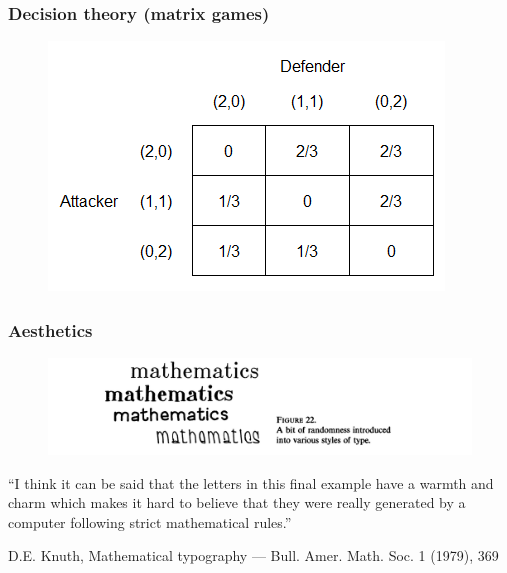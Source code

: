 \documentclass[12pt]{beamer}
\begin{document}
\begin{frame}\frametitle{Decision theory (matrix games)}
\begin{figure}
\includegraphics[scale=0.9]{MatrixGame.png} 
\end{figure}
\end{frame}

\begin{frame}\frametitle{Aesthetics}
\begin{figure}
\includegraphics[scale=0.1]{Aesthetics.png} 
\end{figure}
``I think it can be said that the letters in this final example have a warmth and charm which makes it hard to believe that they were really 
generated by a computer following strict mathematical rules.''
\begin{flushright}
 {\small 
 D.E. Knuth, Mathematical typography --- Bull.  Amer. Math. Soc. 1 (1979), 369
 }
\end{flushright}

\end{frame}
\end{document}
